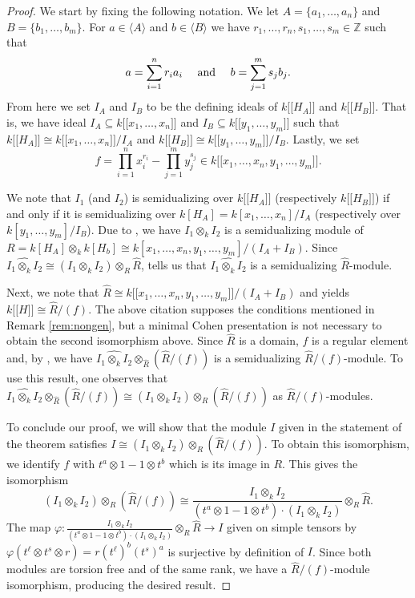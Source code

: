 \documentclass{amsart}
\newcommand{\ZZ}{\mathbb Z}
\newcommand{\ldb}{\mathopen{[\![}} %
\newcommand{\rdb}{\mathclose{]\!]}} %
\theoremstyle{plain}
\theoremstyle{definition}
\numberwithin{theorem}{section}
\numberwithin{equation}{section}
\numberwithin{equation}{theorem}
\begin{document}
\begin{proof}
We start by fixing the following notation. We let $A = \{a_1,\ldots,a_n\}$ and $B = \{b_1,\ldots,b_m\}$. For $a \in \langle A \rangle$ and $b \in \langle B \rangle$ we have $r_1,\ldots,r_n,s_1,\ldots,s_m \in \ZZ$ such that \[a = \sum_{i = 1}^n r_i a_i \quad \hbox{ and } \quad b = \sum_{j = 1}^m s_j b_j.\] From here we set $I_A$ and $I_B$ to be the defining ideals of $k \ldb H_A \rdb$ and $k \ldb H_B \rdb$. That is, we have ideal $I_A \subseteq k \ldb x_1, \ldots, x_n \rdb$ and $I_B \subseteq k \ldb y_1, \ldots, y_m \rdb$ such that $k \ldb H_A \rdb \cong k \ldb x_1, \ldots, x_n \rdb/ I_A$ and $k \ldb H_B \rdb \cong k \ldb y_1, \ldots, y_m \rdb/ I_B$. Lastly, we set \[f = \prod_{i = 1}^n x_i^{r_i} - \prod_{j = 1}^m y_j^{s_j} \in k \ldb x_1,\ldots,x_n,y_1,\ldots,y_m\rdb.\]

We note that $I_1$ (and $I_2$) is semidualizing over $k \ldb H_A \rdb$ (respectively $k \ldb H_B \rdb$) if and only if it is semidualizing over $k[H_A] = k[x_1,\ldots,x_n]/I_A$ (respectively over $k[y_1,\ldots,y_m] / I_B$). Due to \cite[Theorem 1.2(a)]{A}, we have $I_1 \otimes_k I_2$ is a semidualizing module of $R = k[H_A] \otimes_k k[H_b] \cong k [ x_1, \ldots, x_n, y_1, \ldots, y_m ] / (I_A + I_B)$. Since $\widehat{I_1 \otimes_k I_2} \cong \left( I_1 \otimes_k I_2 \right) \otimes_{R} \widehat{ R }$, \cite[Lemma 2.6]{C} tells us that $\widehat{I_1 \otimes_k I_2}$ is a semidualizing $\widehat{R}$-module. 

Next, we note that $\widehat{R} \cong k \ldb x_1, \ldots, x_n, y_1, \ldots, y_m \rdb / (I_A + I_B)$ and \cite[Proposition 2.2]{GS19} yields $k \ldb H \rdb \cong \widehat{R} / (f)$. The above citation supposes the conditions mentioned in Remark \ref{rem:nongen}, but a minimal Cohen presentation is not necessary to obtain the second isomorphism above. Since $\widehat{R}$ is a domain, $f$ is a regular element and, by \cite[Proposition 5.8]{C}, we have $\widehat{I_1 \otimes_k I_2} \otimes_{\widehat{R}} \left(\widehat{R} / (f)\right)$ is a semidualizing $\widehat{R} / (f)$-module. To use this result, one observes that $\widehat{I_1 \otimes_k I_2} \otimes_{\widehat{R}} \left(\widehat{R} / (f)\right) \cong (I_1 \otimes_k I_2) \otimes_R \left(\widehat{R} / (f)\right)$ as $\widehat{R} / (f)$-modules.

To conclude our proof, we will show that the module $I$ given in the statement of the theorem satisfies $I \cong (I_1 \otimes_k I_2) \otimes_R \left(\widehat{R} / (f)\right)$. To obtain this isomorphism, we identify $f$ with $t^a \otimes 1 - 1 \otimes t^b$ which is its image in $R$. This gives the isomorphism \[(I_1 \otimes_k I_2) \otimes_R \left(\widehat{R} / (f)\right) \cong \frac{I_1 \otimes_k I_2}{( t^a \otimes 1 - 1 \otimes t^b ) \cdot (I_1 \otimes_k I_2)} \otimes_R \widehat{R}.\] The map $\varphi : \frac{I_1 \otimes_k I_2}{( t^a \otimes 1 - 1 \otimes t^b ) \cdot (I_1 \otimes_k I_2)} \otimes_R \widehat{R} \to I$ given on simple tensors by $\varphi(t^{\ell} \otimes t^s \otimes r) = r(t^{\ell})^b (t^s)^a$ is surjective by definition of $I$. Since both modules are torsion free and of the same rank, we have a $\widehat{R}/(f)$-module isomorphism, producing the desired result.
\end{proof}
\end{document}
